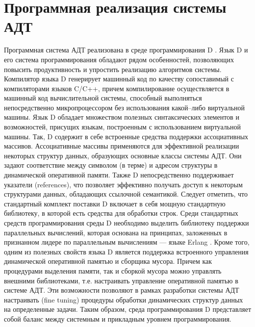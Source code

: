 \section{Программная реализация системы АДТ}

Программная система АДТ реализована в среде программирования D \cite{DPL1,DPL2}. Язык D и его система программирования обладают рядом особенностей, позволяющих повысить продуктивность и упростить реализацию алгоритмов системы. Компилятор языка D генерирует машинный код по качеству сопоставимый с компиляторами языков C/C++, причем компилирование осуществляется в машинный код вычислительной системы, способный выполняться непосредственно микропроцессором без использования какой--либо виртуальной машины. Язык D обладает множеством полезных синтаксических элементов и возможностей, присущих языкам, построенным с использованием виртуальной машины. Так, D содержит в себе встроенные средства поддержки ассоциативных массивов. Ассоциативные массивы применяются для эффективной реализации некоторых структур данных, образующих основные классы системы АДТ. Они задают соответствие между символом (в терме) и адресом структуры в динамической оперативной памяти. Также D непосредственно поддерживает указатели (references), что позволяет эффективно получать доступ к некоторым структурами данных, обладающих ссылочной семантикой. Следует отметить, что стандартный комплект поставки D включает в себя мощную стандартную библиотеку, в которой есть средства для обработки строк. Среди стандартных средств программирования среды D необходимо выделить библиотеку поддержки параллельных вычислений, которая основана на принципах, заложенных в признанном лидере по параллельным вычислениям --- языке Erlang \cite{erlang}. Кроме того, одним из полезных свойств языка D является поддержка встроенного управления динамической оперативной памятью и сборщика мусора. Причем как процедурами выделения памяти, так и сборкой мусора можно управлять внешними библиотеками, т.е. настраивать управление оперативной памятью в системе АДТ. Эти возможности позволяют в рамках разработки системы АДТ настраивать (fine tuning) процедуры обработки динамических структур данных на определенные задачи. Таким образом, среда программирования D представляет собой баланс между системным и прикладным уровнем программирования.


